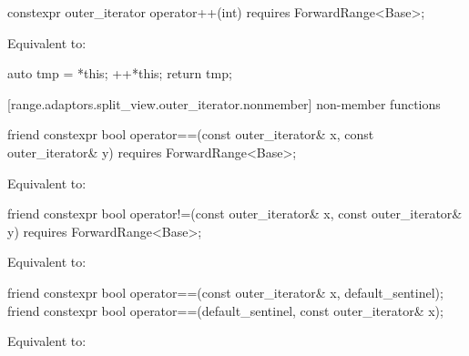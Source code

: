 {{\color{oldclr}
%
\begin{itemdecl}
constexpr outer_iterator operator++(int) requires ForwardRange<Base>;
\end{itemdecl}

\begin{itemdescr}
\pnum
\effects Equivalent to:
\begin{codeblock}
auto tmp = *this;
++*this;
return tmp;
\end{codeblock}
\end{itemdescr}
} %

[range.adaptors.split_view.outer_iterator.nonmember]{ non-member functions}

%
\begin{itemdecl}
friend constexpr bool operator==(const outer_iterator& x, const outer_iterator& y)
  requires ForwardRange<Base>;
\end{itemdecl}

\begin{itemdescr}
\pnum
\effects Equivalent to: 
\end{itemdescr}

%
\begin{itemdecl}
friend constexpr bool operator!=(const outer_iterator& x, const outer_iterator& y)
  requires ForwardRange<Base>;
\end{itemdecl}

\begin{itemdescr}
\pnum
\effects Equivalent to: 
\end{itemdescr}

{\color{newclr}
%
\begin{itemdecl}
friend constexpr bool operator==(const outer_iterator& x, default_sentinel);
friend constexpr bool operator==(default_sentinel, const outer_iterator& x);
\end{itemdecl}

\begin{itemdescr}
\pnum
\effects
Equivalent to: 
\end{itemdescr}

}}

